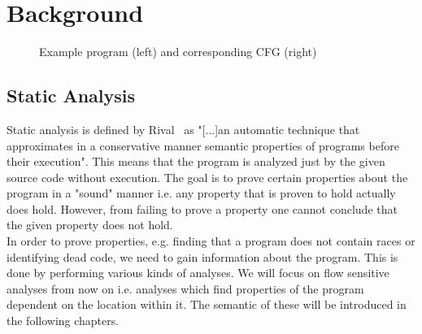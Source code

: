 
\chapter{Background}\label{chapter:background}

\begin{figure}
  \centering
  \begin{subfigure}{.35\textwidth}
    \centering
    
  \end{subfigure}
  \begin{subfigure}{.35\textwidth}
    \centering
  \end{subfigure}
  \caption{Example program (left) and corresponding CFG (right)}
  \label{fig:example_cfg}
\end{figure}

  \section{Static Analysis}
  Static analysis is defined by Rival~\parencite{rival2020introduction} as "[...]an automatic technique that approximates in a conservative manner semantic properties of programs before their execution". This means that the program is analyzed just by the given source code without execution. The goal is to prove certain properties about the program in a "sound" manner i.e. any property that is proven to hold actually does hold. However, from failing to prove a property one cannot conclude that the given property does not hold.\\
  In order to prove properties, e.g. finding that a program does not contain races or identifying dead code, we need to gain information about the program. This is done by performing various kinds of analyses. We will focus on flow sensitive analyses from now on i.e. analyses which find properties of the program dependent on the location within it. The semantic of these will be introduced in the following chapters.
  
